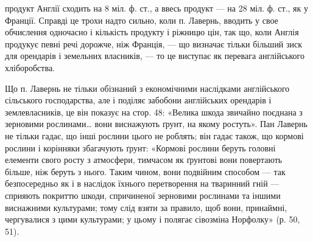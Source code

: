 \parcont{}  %
продукт Англії сходить на 8 міл. ф. ст., а ввесь продукт — на 28 міл. ф. ст.,
як у Франції. Справді це трохи надто сильно, коли п. Лавернь, вводить у свое
обчислення одночасно і кількість продукту і ріжницю цін, так що, коли Англія
продукує певні речі дорожче, ніж Франція, — що визначає тільки більший зиск
для орендарів і земельних власників, — то це виступає як перевага англійського
хліборобства.

Що п. Лавернь не тільки обізнаний з економічними наслідками англійського
сільського господарства, але і поділяє забобони англійських орендарів
і землевласників, це він показує на стор. 48: «Велика шкода звичайно поєднана
з зерновими рослинами\dots{} вони виснажують ґрунт, на якому ростуть».
Пан Лавернь не тільки гадає, що інші рослини цього не роблять; він гадає також,
що кормові рослини і корінняки збагачують ґрунт: «Кормові рослини беруть
головні елементи свого росту з атмосфери, тимчасом як ґрунтові вони повертають
більше, ніж беруть з нього. Таким чином, вони подвійним способом — так
безпосередньо як і в наслідок їхнього перетворення на тваринний гній — сприяють
покриттю шкоди, спричиненої зерновими рослинами та іншими виснажними
культурами; тому слід взяти за правило, щоб вони, принаймні, чергувалися з цими
культурами; у цьому і полягає сівозміна Норфолку» (р. 50, 51).

